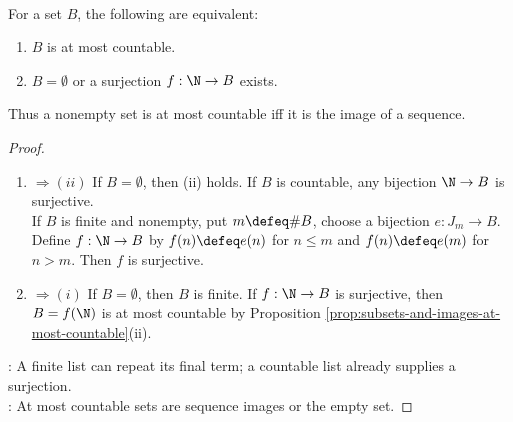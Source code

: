 \begin{proposition} \label{prop:at-most-countable-iff-enumerable-image} \\
For a set $B$, the following are equivalent:
\begin{enumerate}[label=(\roman*)]
\setlength{\itemsep}{0pt}
\item $B$ is at most countable.
\item $B=\emptyset$ or a surjection $f:\N\to B$ exists.
\end{enumerate}
Thus a nonempty set is at most countable iff it is the image of a sequence.
\begin{proof}
\begin{enumerate}[label=(\roman*)]
\setlength{\itemsep}{0pt}
\item[$(i)$] $\Rightarrow(ii)$ If $B=\emptyset$, then (ii) holds. If $B$ is countable, any bijection $\N\to B$ is surjective.\\
If $B$ is finite and nonempty, put $m\defeq\#B$, choose a bijection $e:J_m\to B$.\\
Define $f:\N\to B$ by $f(n)\defeq e(n)$ for $n\leq m$ and $f(n)\defeq e(m)$ for $n>m$. Then $f$ is surjective.
\item[$(ii)$] $\Rightarrow(i)$ If $B=\emptyset$, then $B$ is finite. If $f:\N\to B$ is surjective, then $B=f(\N)$ is at most countable by Proposition \ref{prop:subsets-and-images-at-most-countable}(ii).
\end{enumerate}
: A finite list can repeat its final term; a countable list already supplies a surjection.\\
: At most countable sets are sequence images or the empty set.
\end{proof}
\end{proposition}

